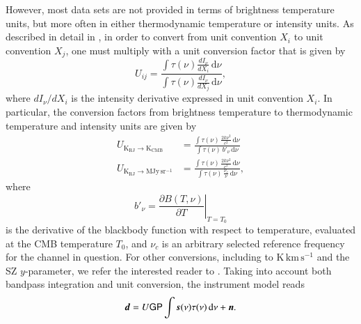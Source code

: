 \documentclass[twocolumn]{aa}
\renewcommand{\d}[0]{\vec{d}}
\newcommand{\n}[0]{\vec{n}}
\newcommand{\s}[0]{\vec{s}}
\renewcommand{\P}[0]{\tens{P}}
\renewcommand{\G}[0]{\tens{G}}
\begin{document}
However, most data sets are not provided in terms of brightness
temperature units, but more often in either thermodynamic temperature
or intensity units. As described in detail in
\citet{planck2013-p03d}, in order to convert from unit
convention $X_i$ to unit convention $X_j$, one must multiply with a
unit conversion factor that is given by
\begin{equation}
U_{ij} = \frac{\int \tau(\nu)\frac{dI_{\nu}}{dX_i}\, \mathrm d\nu}{\int
  \tau(\nu)\frac{dI_{\nu}}{dX_j}\,\mathrm d\nu},
\end{equation}
where $dI_{\nu}/dX_i$ is the intensity derivative expressed in unit convention
$X_i$. In particular, the conversion factors from brightness
temperature to thermodynamic temperature and intensity units are given
by
\begin{align}
U_{\mathrm{K}_{\mathrm{RJ}}\rightarrow \mathrm{K}_{\mathrm{CMB}}} &= \frac{\int
  \tau(\nu)\,\frac{2k\nu^2}{c^2}\,\mathrm d\nu}{\int \tau(\nu)\,b'_{\nu}\,
  \mathrm d\nu}\\
U_{\mathrm{K}_{\mathrm{RJ}}\rightarrow \mathrm{MJy}\,\mathrm{sr}^{-1}} &= \frac{\int
  \tau(\nu)\,\frac{2k\nu^2}{c^2}\,\mathrm d\nu}{\int
    \tau(\nu)\,\frac{\nu_c}{\nu}\,\mathrm d\nu},
\end{align}
where
\begin{equation}
  b'_{\nu} = \left.\frac{\partial B(T,\nu)}{\partial T}\right|_{T=T_0}
\end{equation}
is the derivative of the blackbody function with respect to
temperature, evaluated at the CMB temperature $T_0$, and $\nu_c$ is an
arbitrary selected reference frequency for the channel in
question. For other conversions, including to
$\mathrm{K}\,\mathrm{km}\,\mathrm{s}^{-1}$ and the SZ $y$-parameter,
we refer the interested reader to \citet{planck2013-p03d}. Taking into
account both bandpass integration and unit conversion, the instrument
model reads
\begin{equation}
  \d = U \G\P\int \s(\nu)\tau(\nu)\,\mathrm d\nu + \n.
  \label{eq:unit}
\end{equation}
\end{document}
